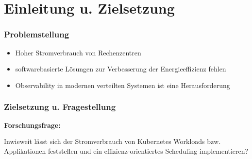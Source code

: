 \documentclass{beamer}
\title{\yourThesisTitle}
\subtitle{\typeOfWork}
\author{\yourNameInclTitle}
\begin{document}

\maketitle

\section{Einleitung u. Zielsetzung}

\begin{frame}
    \frametitle{Problemstellung}
    \begin{itemize}
        \item Hoher Stromverbrauch von Rechenzentren
        \item softwarebasierte Lösungen zur Verbesserung der Energieeffizienz fehlen
        \item Observability in modernen verteilten Systemen ist eine Herausforderung
    \end{itemize}
\end{frame}

\begin{frame}
    \frametitle{Zielsetzung u. Fragestellung}
    \textbf{Forschungsfrage: }
    \begin{center}
        \large{Inwieweit lässt sich der Stromverbrauch von Kubernetes Workloads bzw. Applikationen feststellen und ein effizienz-orientiertes Scheduling implementieren?}
    \end{center}
\end{frame}

%
\end{document}
